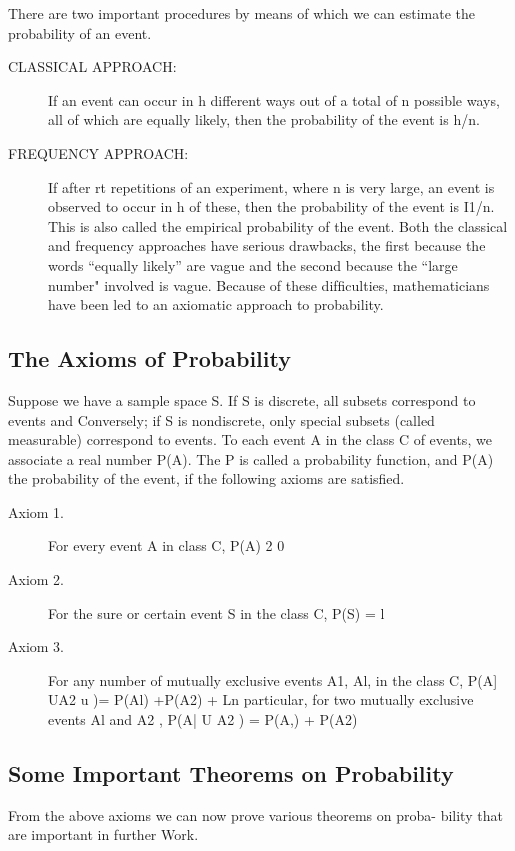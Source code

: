 There are two important procedures by means of which we can estimate the probability of an event.

\begin{description}
\item[CLASSICAL APPROACH:] If an event can occur in h
different ways out of a total of n possible ways, all of which
are equally likely, then the probability of the event is h/n.
\item[FREQUENCY APPROACH:] If after rt repetitions of an
experiment, where n is very large, an event is observed to
occur in h of these, then the probability of the event is I1/n. This
is also called the empirical probability of the event.
Both the classical and frequency approaches have serious drawbacks,
the ﬁrst because the words “equally likely” are vague and the second
because the “large number" involved is vague. Because of these difﬁculties,
mathematicians have been led to an axiomatic approach to probability.
\end{description}
\subsection*{The Axioms of Probability}
Suppose we have a sample space S. If S is discrete, all subsets correspond to events and Conversely; if S is nondiscrete, only special subsets (called measurable) correspond to events. To each event A in the class C of events, we associate a real number P(A). The P is called a probability function, and P(A) the probability of the event, if the following axioms are satisﬁed.


\begin{description}
\item[Axiom 1.] For every event A in class C,
P(A) 2 0
\item[Axiom 2.] For the sure or certain event S in the class C,
P(S) = l
\item[Axiom 3.] For any number of mutually exclusive events A1, Al, 
in the class C,
P(A] UA2 u  )= P(Al) +P(A2) + 
Ln particular, for two mutually exclusive events Al and A2 ,
P(A| U A2 ) = P(A,) + P(A2)
\end{description}

\subsection*{Some Important Theorems on Probability}
From the above axioms we can now prove various theorems on proba-
bility that are important in further Work.

